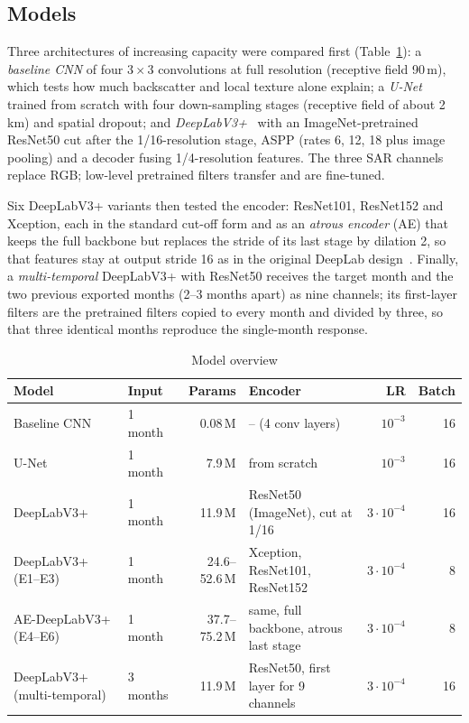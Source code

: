 \documentclass[12pt,conference]{IEEEtran}
\begin{document}
\subsection{Models}

Three architectures of increasing capacity were compared first (Table~\ref{tab:models}): a \emph{baseline CNN} of four
$3\times3$ convolutions at full resolution (receptive field 90\,m), which tests how much backscatter and local texture
alone explain; a \emph{U-Net}~\cite{ronneberger2015unet} trained from scratch with four down-sampling stages
(receptive field of about 2\,km) and spatial dropout; and \emph{DeepLabV3+}~\cite{chen2018encoder} with an
ImageNet-pretrained ResNet50 cut after the 1/16-resolution stage, ASPP (rates 6, 12, 18 plus image pooling) and a
decoder fusing 1/4-resolution features. The three SAR channels replace RGB; low-level pretrained filters transfer and
are fine-tuned.

Six DeepLabV3+ variants then tested the encoder: ResNet101, ResNet152 and Xception, each in the standard cut-off form
and as an \emph{atrous encoder} (AE) that keeps the full backbone but replaces the stride of its last stage by dilation
2, so that features stay at output stride 16 as in the original DeepLab design~\cite{chen2017rethinking}. Finally, a
\emph{multi-temporal} DeepLabV3+ with ResNet50 receives the target month and the two previous exported months (2--3
months apart) as nine channels; its first-layer filters are the pretrained filters copied to every month and divided
by three, so that three identical months reproduce the single-month response.

\begin{table}[t]
\caption{Model overview}
\label{tab:models}
\centering\small
\begin{tabular}{@{}llrlrr@{}}
\toprule
Model & Input & Params & Encoder & LR & Batch \\
\midrule
Baseline CNN & 1 month & 0.08\,M & -- (4 conv layers) & $10^{-3}$ & 16 \\
U-Net & 1 month & 7.9\,M & from scratch & $10^{-3}$ & 16 \\
DeepLabV3+ & 1 month & 11.9\,M & ResNet50 (ImageNet), cut at 1/16 & $3\cdot10^{-4}$ & 16 \\
DeepLabV3+ (E1--E3) & 1 month & 24.6--52.6\,M & Xception, ResNet101, ResNet152 & $3\cdot10^{-4}$ & 8 \\
AE-DeepLabV3+ (E4--E6) & 1 month & 37.7--75.2\,M & same, full backbone, atrous last stage & $3\cdot10^{-4}$ & 8 \\
DeepLabV3+ (multi-temporal) & 3 months & 11.9\,M & ResNet50, first layer for 9 channels & $3\cdot10^{-4}$ & 16 \\
\bottomrule
\end{tabular}
\end{table}
\end{document}
